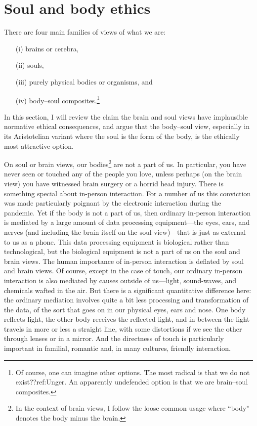 \section{Soul and body ethics}
There are four main families of views of what we are:
\begin{enumerate}
\item[(i)] brains or cerebra, 
\item[(ii)] souls, 
\item[(iii)] purely physical bodies or organisms, and 
\item[(iv)] body--soul composites.\footnote{Of course, one can imagine other options. The most radical is that we do not 
exist??ref:Unger. An apparently undefended option is that we are brain--soul composites.} 
\end{enumerate}
In this section, I will review 
the claim the brain and soul views have implausible normative ethical consequences, and argue that the body--soul view,
especially in its Aristotelian variant where the soul is the form of the body, is the ethically most attractive option.

On soul or brain views, our bodies\footnote{In the context of brain views, I follow the loose common usage
where ``body'' denotes the body minus the brain.} are not a part of us. In particular, you have never seen 
or touched any of the people you love, unless perhaps (on the brain view) you have witnessed brain surgery or 
a horrid head injury. There is something special about in-person interaction. For a number of us 
this conviction was made particularly poignant by the electronic interaction during the pandemic. Yet if the body
is not a part of us, then ordinary in-person interaction is mediated by a large amount of data processing
equipment---the eyes, ears, and nerves (and including the brain itself on the soul view)---that 
is just as external to us as a phone. This data processing equipment is biological rather than technological, but the biological equipment is not a part of us on the soul and brain views. The human importance of in-person interaction
is deflated by soul and brain views. Of course, except in the case of touch, our ordinary in-person interaction is
also mediated by causes outside of us---light, sound-waves, and chemicals wafted in the air. But there is a significant
quantitative difference here: the ordinary mediation involves quite a bit less processing and transformation of the 
data, of the sort that goes on in our physical eyes, ears and nose. One body reflects light, the other body receives
the reflected light, and in between the light travels in more or less a straight line, with some distortions if we
see the other through lenses or in a mirror. And the directness of touch is particularly important in familial,
romantic and, in many cultures, friendly interaction. 

